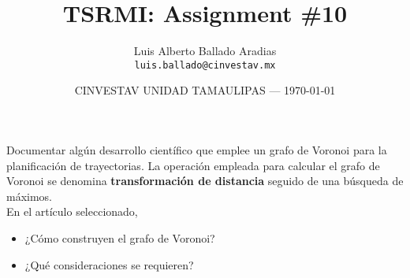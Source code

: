 \documentclass{article}
\title{TSRMI: Assignment \#10} %
\author{Luis Alberto Ballado Aradias\\ \texttt{luis.ballado@cinvestav.mx}} %
\date{CINVESTAV UNIDAD TAMAULIPAS --- \today} %
\begin{document}
\maketitle %


Documentar algún desarrollo científico que emplee un grafo de Voronoi para la planificación de trayectorias. La operación empleada para calcular el grafo de Voronoi se denomina \textbf{transformación de distancia} seguido de una búsqueda de máximos.\\

En el artículo seleccionado, 
\begin{itemize}
\item ¿Cómo construyen el grafo de Voronoi?
\item ¿Qué consideraciones se requieren?
\end{itemize}
\end{document}

